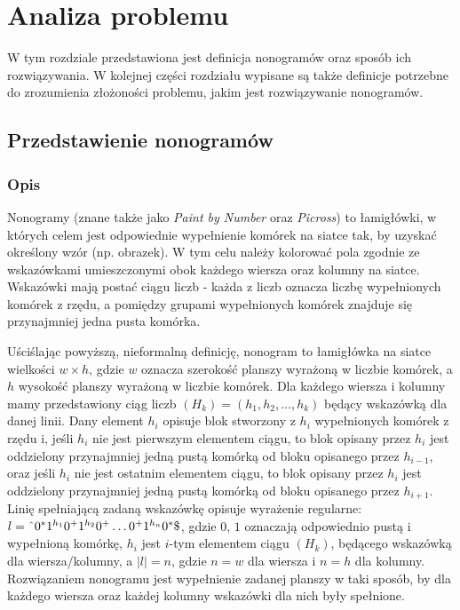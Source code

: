 \chapter{Analiza problemu}
\thispagestyle{chapterBeginStyle}
\label{rozdzial1}

    W tym rozdziale przedstawiona jest definicja nonogramów oraz sposób ich rozwiązywania.
W kolejnej części rozdziału wypisane są także definicje potrzebne do zrozumienia złożoności problemu,
jakim jest rozwiązywanie nonogramów.



\section{Przedstawienie nonogramów}


\subsection{Opis}
    Nonogramy (znane także jako \textit{Paint by Number} oraz \textit{Picross}) to łamigłówki, w których
celem jest odpowiednie wypełnienie komórek na siatce tak, by uzyskać określony wzór (np. obrazek).
W tym celu należy kolorować pola zgodnie ze wskazówkami umieszczonymi obok każdego wiersza oraz kolumny
na siatce. Wskazówki mają postać ciągu liczb - każda z liczb oznacza liczbę wypełnionych komórek z rzędu,
a pomiędzy grupami wypełnionych komórek znajduje się przynajmniej jedna pusta komórka.

    Uściślając powyższą, nieformalną definicję, nonogram to łamigłówka na siatce wielkości $w \times h$,
gdzie $w$ oznacza szerokość planszy wyrażoną w liczbie komórek, a $h$ wysokość planszy wyrażoną w
liczbie komórek. Dla każdego wiersza i kolumny mamy przedstawiony ciąg liczb 
$(H_k) = (h_1, h_2, \ldots, h_k)$ będący wskazówką
dla danej linii. Dany element $h_i$ opisuje blok stworzony z $h_i$ wypełnionych komórek z rzędu i, jeśli
$h_i$ nie jest pierwszym elementem ciągu, to blok opisany przez $h_i$ jest oddzielony 
przynajmniej jedną pustą komórką od bloku opisanego przez $h_{i-1}$, 
oraz jeśli $h_i$ nie jest ostatnim elementem ciągu, to blok opisany przez $h_i$ jest oddzielony
przynajmniej jedną pustą komórką od bloku opisanego przez $h_{i+1}$. Linię spełniającą zadaną wskazówkę
opisuje wyrażenie regularne: $l=\text{\^{}}0^*1^{h_1}0^+1^{h_2}0^+\ldots0^+1^{h_n}0^*\text{\$}$, gdzie 
$0$, $1$ oznaczają odpowiednio pustą i wypełnioną komórkę, $h_i$ jest $i$-tym elementem ciągu $(H_k)$,
będącego wskazówką dla wiersza/kolumny, a $|l| = n$, gdzie $n = w$ dla wiersza i $n = h$ dla kolumny. 
Rozwiązaniem nonogramu jest wypełnienie zadanej planszy w taki sposób, 
by dla każdego wiersza oraz każdej kolumny wskazówki dla nich były spełnione.

